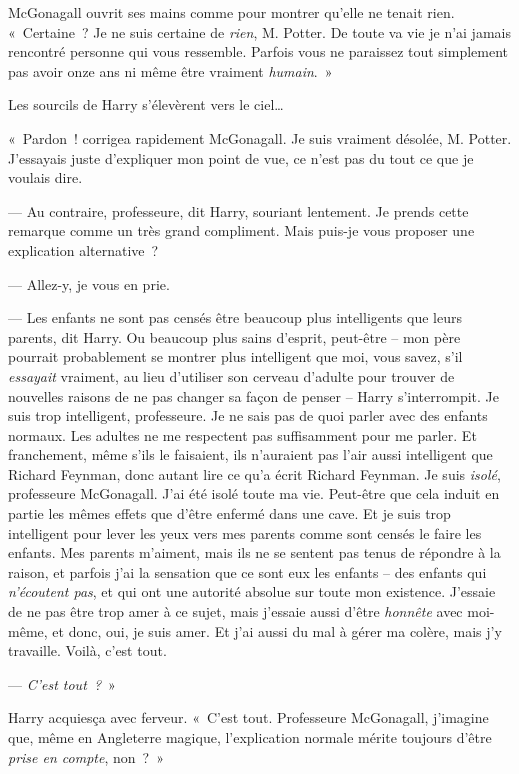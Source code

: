 McGonagall ouvrit ses mains comme pour montrer qu'elle ne tenait rien.
«~Certaine~? Je ne suis certaine de \emph{rien}, M. Potter.
De toute va vie je n'ai jamais rencontré personne qui vous ressemble.
Parfois vous ne paraissez tout simplement pas avoir onze ans ni même être vraiment \emph{humain}.~»

Les sourcils de Harry s'élevèrent vers le ciel…

«~Pardon~! corrigea rapidement McGonagall. Je suis vraiment désolée, M. Potter.
J'essayais juste d'expliquer mon point de vue, ce n'est pas du tout ce que je voulais dire.

--- Au contraire, professeure, dit Harry, souriant lentement.
Je prends cette remarque comme un très grand compliment.
Mais puis-je vous proposer une explication alternative~?

--- Allez-y, je vous en prie.

--- Les enfants ne sont pas censés être beaucoup plus intelligents que leurs parents, dit Harry.
Ou beaucoup plus sains d'esprit, peut-être --
mon père pourrait probablement se montrer plus intelligent que moi, vous savez, s'il \emph{essayait} vraiment, au lieu d'utiliser son cerveau d'adulte pour trouver de nouvelles raisons de ne pas changer sa façon de penser -- Harry s'interrompit.
Je suis trop intelligent, professeure.
Je ne sais pas de quoi parler avec des enfants normaux.
Les adultes ne me respectent pas suffisamment pour me parler.
Et franchement, même s'ils le faisaient, ils n'auraient pas l'air aussi intelligent que Richard Feynman, donc autant lire ce qu'a écrit Richard Feynman.
Je suis \emph{isolé}, professeure McGonagall. J'ai été isolé toute ma vie.
Peut-être que cela induit en partie les mêmes effets que d'être enfermé dans une cave.
Et je suis trop intelligent pour lever les yeux vers mes parents comme sont censés le faire les enfants.
Mes parents m'aiment, mais ils ne se sentent pas tenus de répondre à la raison, et parfois j'ai la sensation que ce sont eux les enfants --
des enfants qui \emph{n'écoutent pas}, et qui ont une autorité absolue sur toute mon existence.
J'essaie de ne pas être trop amer à ce sujet, mais j'essaie aussi d'être \emph{honnête} avec moi-même, et donc, oui, je suis amer.
Et j'ai aussi du mal à gérer ma colère, mais j'y travaille.
Voilà, c'est tout.

--- \emph{C'est tout~?}~»

Harry acquiesça avec ferveur. «~C'est tout.
Professeure McGonagall, j'imagine que, même en Angleterre magique, l'explication normale mérite toujours d'être \emph{prise en compte}, non~?~»

